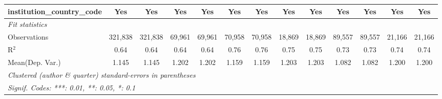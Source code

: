 \begin{tabular}{lcccccccccccc}
   institution\_country\_code               & Yes            & Yes            & Yes           & Yes          & Yes            & Yes            & Yes           & Yes           & Yes            & Yes            & Yes          & Yes\\  
   \midrule
   \emph{Fit statistics}\\
   Observations                             & 321,838        & 321,838        & 69,961        & 69,961       & 70,958         & 70,958         & 18,869        & 18,869        & 89,557         & 89,557         & 21,166       & 21,166\\  
   R$^2$                                    & 0.64           & 0.64           & 0.64          & 0.64         & 0.76           & 0.76           & 0.75          & 0.75          & 0.73           & 0.73           & 0.74         & 0.74\\  
Mean(Dep. Var.) & 1.145 & 1.145 & 1.202 & 1.202 & 1.159 & 1.159 & 1.203 & 1.203 & 1.082 & 1.082 & 1.200 & 1.200 \\
   \midrule \midrule
   \multicolumn{13}{l}{\emph{Clustered (author \& quarter) standard-errors in parentheses}}\\
   \multicolumn{13}{l}{\emph{Signif. Codes: ***: 0.01, **: 0.05, *: 0.1}}\\
\end{tabular}
\par\endgroup
